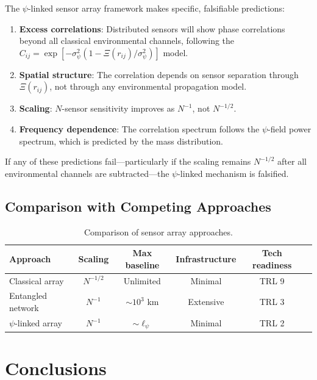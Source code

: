 \documentclass[12pt,a4paper]{article}
\theoremstyle{remark}
\begin{document}
The $\psi$-linked sensor array framework makes specific, falsifiable
predictions:
\begin{enumerate}
\item \textbf{Excess correlations}: Distributed sensors will show phase
correlations beyond all classical environmental channels, following the
$C_{ij} = \exp[-\sigma_\psi^2(1 - \Xi(r_{ij})/\sigma_\psi^2)]$ model.
\item \textbf{Spatial structure}: The correlation depends on sensor
separation through $\Xi(r_{ij})$, not through any environmental propagation
model.
\item \textbf{Scaling}: $N$-sensor sensitivity improves as $N^{-1}$, not
$N^{-1/2}$.
\item \textbf{Frequency dependence}: The correlation spectrum follows the
$\psi$-field power spectrum, which is predicted by the mass distribution.
\end{enumerate}

If any of these predictions fail---particularly if the scaling remains
$N^{-1/2}$ after all environmental channels are subtracted---the
$\psi$-linked mechanism is falsified.

\subsection{Comparison with Competing Approaches}

\begin{table}[H]
\centering
\small
\begin{tabular}{lccccc}
\toprule
\textbf{Approach} & \textbf{Scaling} & \textbf{Max baseline} &
\textbf{Infrastructure} & \textbf{Tech readiness} \\
\midrule
Classical array & $N^{-1/2}$ & Unlimited & Minimal & TRL 9 \\
Entangled network & $N^{-1}$ & $\sim 10^3$ km & Extensive & TRL 3 \\
$\psi$-linked array & $N^{-1}$ & $\sim \ell_\psi$ & Minimal & TRL 2 \\
\bottomrule
\end{tabular}
\caption{Comparison of sensor array approaches.}
\label{tab:comparison}
\end{table}


\section{Conclusions}\label{sec:conclusions}
\end{document}
